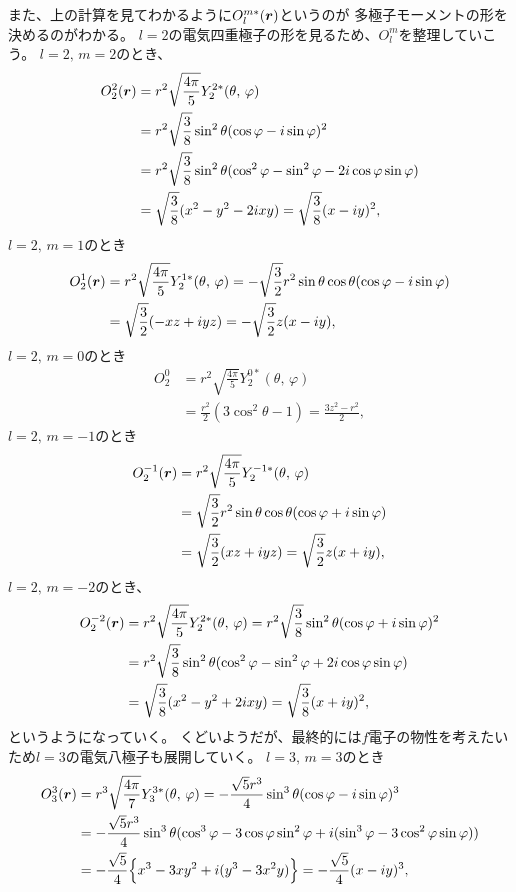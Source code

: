 \documentclass[../../master.tex]{subfiles}
\begin{document}
また、上の計算を見てわかるように\(O_l^{m*}(\vb*{r})\)というのが
多極子モーメントの形を決めるのがわかる。
\(l=2\)の電気四重極子の形を見るため、\(O_l^m\)を整理していこう。
\(l=2,\,m=2\)のとき、
\begin{align}
    O_2^{2}(\vb*{r})
    &= r^2\sqrt{\frac{4\pi}{5}}Y_2^{2*}(\theta,\,\varphi)\\
    &= r^2\sqrt{\frac{3}{8}} \sin^2\theta(\cos\varphi - i\sin\varphi)^2\\
    &= r^2\sqrt{\frac{3}{8}}\sin^2\theta(\cos^2\varphi-\sin^2\varphi - 2i\cos\varphi\sin\varphi)\\
    &=\sqrt{\frac{3}{8}}(x^2-y^2-2ixy)
    =\sqrt{\frac{3}{8}}(x-iy)^2,
\end{align}
\(l=2,\,m=1\)のとき
\begin{align}
    O_2^{1}(\vb*{r})
    &= r^2 \sqrt{\frac{4\pi}{5}}Y_2^{1*}(\theta,\,\varphi)
    = -\sqrt{\frac{3}{2}}r^2\sin\theta\cos\theta (\cos\varphi - i\sin\varphi)\\
    &= \sqrt{\frac{3}{2}}(-xz+iyz) = -\sqrt{\frac{3}{2}}z(x-iy),
\end{align}
\(l=2,\,m=0\)のとき
\begin{align}
    O_2^{0}
    &= r^2 \sqrt{\frac{4\pi}{5}}Y_2^{0*}(\theta,\,\varphi)\\
    &= \frac{r^2}{2}(3\cos^2\theta-1) = \frac{3z^2-r^2}{2},
\end{align}
\(l=2,\,m=-1\)のとき
\begin{align}
    O_2^{-1}(\vb*{r})
    &= r^2 \sqrt{\frac{4\pi}{5}}Y_2^{-1*}(\theta,\,\varphi)\\
    &= \sqrt{\frac{3}{2}}r^2\sin\theta\cos\theta (\cos\varphi + i\sin\varphi)\\
    &= \sqrt{\frac{3}{2}}(xz+iyz) = \sqrt{\frac{3}{2}}z(x+iy),
\end{align}
\(l=2,\,m=-2\)のとき、
\begin{align}
    O_2^{-2}(\vb*{r})
    &= r^2\sqrt{\frac{4\pi}{5}}Y_2^{2*}(\theta,\,\varphi)
    = r^2\sqrt{\frac{3}{8}} \sin^2\theta(\cos\varphi + i\sin\varphi)^2\\
    &= r^2\sqrt{\frac{3}{8}} \sin^2\theta(\cos^2\varphi-\sin^2\varphi + 2i\cos\varphi\sin\varphi)\\
    &=\sqrt{\frac{3}{8}}(x^2-y^2+2ixy) = \sqrt{\frac{3}{8}}(x+iy)^2,
\end{align}
というようになっていく。
くどいようだが、最終的には\(f\)電子の物性を考えたいため\(l=3\)の電気八極子も展開していく。
\(l=3,\,m=3\)のとき
\begin{align}
    O_3^3(\vb*{r})
    &= r^3 \sqrt{\frac{4\pi}{7}} Y_3^{3*}(\theta,\,\varphi)
    = -\frac{\sqrt{5}r^3}{4} \sin^3\theta (\cos\varphi-i\sin\varphi)^3\\
    &= -\frac{\sqrt{5}r^3}{4} \sin^3\theta (\cos^3\varphi - 3\cos\varphi\sin^2\varphi + i(\sin^3\varphi - 3\cos^2\varphi\sin\varphi))\\
    &= -\frac{\sqrt{5}}{4} \Big\{x^3-3xy^2+i(y^3- 3x^2y)\Big\}
    = -\frac{\sqrt{5}}{4} (x-iy)^3,
\end{align}
\end{document}
